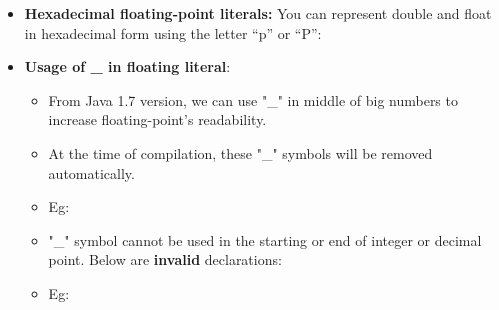 \begin{flushleft}
\begin{itemize}
		\item \textbf{Hexadecimal floating-point literals:} You can represent double and float in hexadecimal form using the letter “p” or “P”:
		\bigskip		
	
		\bigskip
		\item \textbf{Usage of \_ in floating literal}:
		\begin{itemize}
			\item From Java 1.7 version, we can use "\_" in middle of big numbers to increase floating-point's readability.
			\item At the time of compilation, these "\_" symbols will be removed automatically.
			\item Eg:
					\bigskip
			
			\item "\_" symbol cannot be used in the starting or end of integer or decimal point. Below are \textbf{invalid} declarations:
			\item Eg:
					\bigskip
						
		\end{itemize}	
		
	\end{itemize}
	
\end{flushleft}

\newpage

